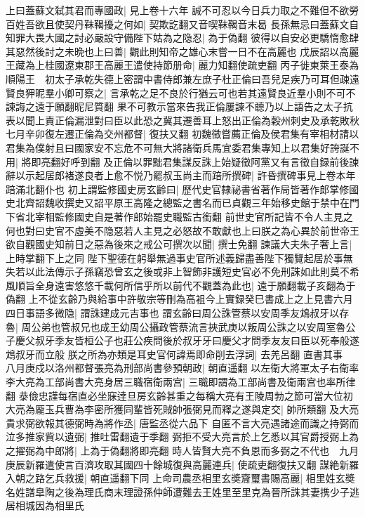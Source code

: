 上曰蓋蘇文弑其君而專國政|{
	見上卷十六年}
誠不可忍以今日兵力取之不難但不欲勞百姓吾欲且使契丹靺鞨擾之何如|{
	契欺訖翻又音喫靺鞨音末曷}
長孫無忌曰蓋蘇文自知罪大畏大國之討必嚴設守備陛下姑為之隐忍|{
	為于偽翻}
彼得以自安必更驕惰愈肆其惡然後討之未晩也上曰善|{
	觀此則知帝之雄心末嘗一日不在高麗也}
戊辰詔以高麗王藏為上桂國遼東郡王高麗王遣使持節册命|{
	麗力知翻使疏吏翻}
丙子徙東萊王泰為順陽王　初太子承乾失德上密謂中書侍郎兼左庶子杜正倫曰吾兒足疾乃可耳但疎遠賢良狎昵羣小卿可察之|{
	言承乾之足不良於行猶云可也若其遠賢良近羣小則不可不諫誨之遠于願翻昵尼質翻}
果不可教示當來告我正倫屢諫不聼乃以上語告之太子抗表以聞上責正倫漏泄對曰臣以此恐之冀其遷善耳上怒出正倫為穀州刺史及承乾敗秋七月辛卯復左遷正倫為交州都督|{
	復扶又翻}
初魏徵嘗薦正倫及侯君集有宰相材請以君集為僕射且曰國家安不忘危不可無大將諸衛兵馬宜委君集專知上以君集好誇誕不用|{
	將即亮翻好呼到翻}
及正倫以罪黜君集謀反誅上始疑徵阿黨又有言徵自録前後諫辭以示起居郎褚遂良者上愈不悦乃罷叔玉尚主而踣所撰碑|{
	許昏撰碑事見上卷本年踣滿北翻仆也}
初上謂監修國史房玄齡曰|{
	歷代史官隸祕書省著作局皆著作郎掌修國史北齊詔魏收撰史又詔平原王高隆之總監之書名而已貞觀三年始移史館于禁中在門下省北宰相監修國史自是著作郎始罷史職監古銜翻}
前世史官所記皆不令人主見之何也對曰史官不虛美不隐惡若人主見之必怒故不敢獻也上曰朕之為心異於前世帝王欲自觀國史知前日之惡為後來之戒公可撰次以聞|{
	撰士免翻}
諫議大夫朱子奢上言|{
	上時掌翻下上之同}
陛下聖德在躬舉無過事史官所述義歸盡善陛下獨覽起居於事無失若以此法傳示子孫竊恐曾玄之後或非上智飾非護短史官必不免刑誅如此則莫不希風順旨全身遠害悠悠千載何所信乎所以前代不觀蓋為此也|{
	遠于願翻載子亥翻為于偽翻}
上不從玄齡乃與給事中許敬宗等刪為高袓今上實録癸巳書成上之上見書六月四日事語多微隐|{
	謂誅建成元吉事也}
謂玄齡曰周公誅管蔡以安周季友鴆叔牙以存魯|{
	周公弟也管叔兄也成王幼周公攝政管蔡流言挾武庚以叛周公誅之以安周室魯公子慶父叔牙季友皆桓公子也莊公疾問後於叔牙牙曰慶父才問季友友曰臣以死奉般遂鴆叔牙而立般}
朕之所為亦類是耳史官何諱焉即命削去浮詞|{
	去羌呂翻}
直書其事　八月庚戍以洛州都督張亮為刑部尚書參預朝政|{
	朝直遥翻}
以左衛大將軍太子右衛率李大亮為工部尚書大亮身居三職宿衛兩宫|{
	三職即謂為工部尚書及衛兩宫也率所律翻}
㳟儉忠謹每宿直必坐寐逹旦房玄齡甚重之每稱大亮有王陵周勃之節可當大位初大亮為龎玉兵曹為李密所獲同輩皆死賊帥張弼見而釋之遂與定交|{
	帥所類翻}
及大亮貴求弼欲報其德弼時為將作丞|{
	唐監丞從六品下}
自匿不言大亮遇諸途而識之持弼而泣多推家貲以遺弼|{
	推吐雷翻遺于季翻}
弼拒不受大亮言於上乞悉以其官爵授弼上為之擢弼為中郎將|{
	上為于偽翻將即亮翻}
時人皆賢大亮不負恩而多弼之不代也　九月庚辰新羅遣使言百濟攻取其國四十餘城復與高麗連兵|{
	使疏吏翻復扶又翻}
謀絶新羅入朝之路乞兵救援|{
	朝直遥翻下同}
上命司農丞相里玄奬齎璽書賜高麗|{
	相里姓玄奬名姓譜臯陶之後為理氏商末理證孫仲師遭難去王姓里至里克為晉所誅其妻携少子逃居相城因為相里氏}
